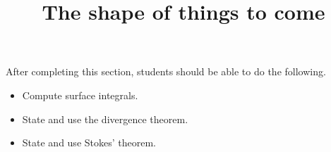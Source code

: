 \documentclass{ximera}
\title{The shape of things to come}
\begin{document}
\begin{abstract}
\end{abstract}
\maketitle
\begin{sectionOutcomes}

After completing this section, students should be able to do the following.

\begin{itemize}
\item Compute surface integrals.
\item State and use the divergence theorem.
\item State and use Stokes' theorem.
\end{itemize}

\end{sectionOutcomes}
\end{document}
